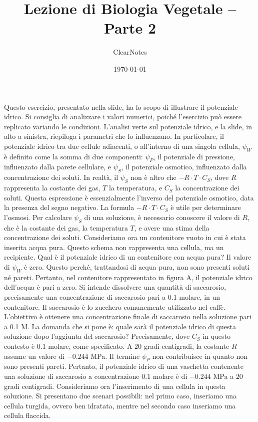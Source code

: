 \documentclass[11pt, a4paper]{article}
\title{Lezione di Biologia Vegetale -- Parte 2}
\author{ClearNotes}
\date{\today}
\begin{document}
\maketitle
\begin{spacing}{1}
Questo esercizio, presentato nella slide, ha lo scopo di illustrare il potenziale idrico. Si consiglia di analizzare i valori numerici, poiché l'esercizio può essere replicato variando le condizioni. L'analisi verte sul potenziale idrico, e la slide, in alto a sinistra, riepiloga i parametri che lo influenzano. In particolare, il potenziale idrico tra due cellule adiacenti, o all'interno di una singola cellula, $\psi_W$ è definito come la somma di due componenti: $\psi_P$, il potenziale di pressione, influenzato dalla parete cellulare, e $\psi_S$, il potenziale osmotico, influenzato dalla concentrazione dei soluti.
In realtà, il $\psi_S$ non è altro che $-R \cdot T \cdot C_S$, dove $R$ rappresenta la costante dei gas, $T$ la temperatura, e $C_S$ la concentrazione dei soluti. Questa espressione è essenzialmente l'inverso del potenziale osmotico, data la presenza del segno negativo. La formula $-R \cdot T \cdot C_S$ è utile per determinare l'osmosi. Per calcolare $\psi_S$ di una soluzione, è necessario conoscere il valore di $R$, che è la costante dei gas, la temperatura $T$, e avere una stima della concentrazione dei soluti.
Consideriamo ora un contenitore vuoto in cui è stata inserita acqua pura. Questo schema non rappresenta una cellula, ma un recipiente. Qual è il potenziale idrico di un contenitore con acqua pura? Il valore di $\psi_W$ è zero. Questo perché, trattandosi di acqua pura, non sono presenti soluti né pareti. Pertanto, nel contenitore rappresentato in figura A, il potenziale idrico dell'acqua è pari a zero.
Si intende dissolvere una quantit\`a di saccarosio, precisamente una concentrazione di saccarosio pari a 0.1 molare, in un contenitore. Il saccarosio \`e lo zucchero comunemente utilizzato nel caff\`e. L'obiettivo \`e ottenere una concentrazione finale di saccarosio nella soluzione pari a 0.1 M. La domanda che si pone \`e: quale sar\`a il potenziale idrico di questa soluzione dopo l'aggiunta del saccarosio?
Precisamente, dove $C_S$ in questo contesto è 0.1 molare, come specificato. A $20$ gradi centigradi, la costante $R$ assume un valore di $-0.244$ MPa. Il termine $\psi_P$ non contribuisce in quanto non sono presenti pareti. Pertanto, il potenziale idrico di una vaschetta contenente una soluzione di saccarosio a concentrazione $0.1$ molare è di $-0.244$ MPa a $20$ gradi centigradi. Consideriamo ora l'inserimento di una cellula in questa soluzione. Si presentano due scenari possibili: nel primo caso, inseriamo una cellula turgida, ovvero ben idratata, mentre nel secondo caso inseriamo una cellula flaccida.

\end{spacing}
\end{document}
